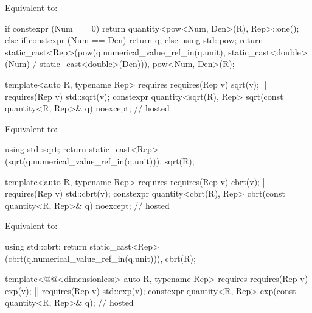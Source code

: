 \begin{itemdescr}
\pnum
\effects
Equivalent to:
\begin{codeblock}
if constexpr (Num == 0) {
  return quantity<pow<Num, Den>(R), Rep>::one();
} else if constexpr (Num == Den) {
  return q;
} else {
  using std::pow;
  return {static_cast<Rep>(pow(q.numerical_value_ref_in(q.unit),
                               static_cast<double>(Num) / static_cast<double>(Den))),
          pow<Num, Den>(R)};
}
\end{codeblock}
\end{itemdescr}

\begin{itemdecl}
template<auto R, typename Rep>
  requires requires(Rep v) { sqrt(v); } || requires(Rep v) { std::sqrt(v); }
constexpr quantity<sqrt(R), Rep> sqrt(const quantity<R, Rep>& q) noexcept;              // hosted
\end{itemdecl}

\begin{itemdescr}
\pnum
\effects
Equivalent to:
\begin{codeblock}
using std::sqrt;
return {static_cast<Rep>(sqrt(q.numerical_value_ref_in(q.unit))), sqrt(R)};
\end{codeblock}
\end{itemdescr}

\begin{itemdecl}
template<auto R, typename Rep>
  requires requires(Rep v) { cbrt(v); } || requires(Rep v) { std::cbrt(v); }
constexpr quantity<cbrt(R), Rep> cbrt(const quantity<R, Rep>& q) noexcept;              // hosted
\end{itemdecl}

\begin{itemdescr}
\pnum
\effects
Equivalent to:
\begin{codeblock}
using std::cbrt;
return {static_cast<Rep>(cbrt(q.numerical_value_ref_in(q.unit))), cbrt(R)};
\end{codeblock}
\end{itemdescr}

\begin{itemdecl}
template<@@<dimensionless> auto R, typename Rep>
  requires requires(Rep v) { exp(v); } || requires(Rep v) { std::exp(v); }
constexpr quantity<R, Rep> exp(const quantity<R, Rep>& q);                              // hosted
\end{itemdecl}


